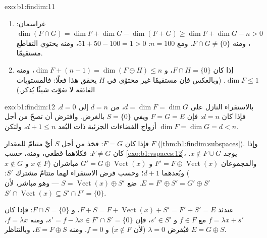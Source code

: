 \begin{solution}{exo:b1:findim:11}
\begin{enumerate}
  \item غراسمان: $\dim(F \cap G) = \dim F + \dim G - \dim(F +
        G) \geq \dim F + \dim G - n > 0$، ومنه $F \cap G \neq
        \{0\}$. ومع $n = 100$: $51 + 50 - 100 = 1 > 0$، ومنه
        يحتوي التقاطع مستقيمًا.
  \item إذا كان $F \cap H = \{0\}$،  و $\dim F +
        (n - 1) = \dim(F \oplus H) \leq n$، ومنه $\dim F \leq 1$.
        (وبالعكس فإن مستقيمًا غير محتوًى في $H$ يحقق
        هذا فعلًا: فالمستويات الفائقة لا تفوّت شيئًا يُذكر.)
\end{enumerate}
\end{solution}

\begin{solution}{exo:b1:findim:12}
بالاستقراء النازل على $d = \dim F = \dim G$، من $d = n$ إلى $d =
0$. فإذا كان $d = n$: فإن $F = G = E$ ويفي $S = \{0\}$ بالغرض. وافترض أن
 تصحّ من أجل أزواج الفضاءات الجزئية ذات البُعد $d + 1 \leq n$،
ولتكن $\dim F = \dim G = d < n$.

فإذا كان $F = G$: فخذ من أجل $S$ أيَّ متتامّ للمقدار $F$
(\cref{thm:b1:findim:subspaces}). وإذا كان $F \neq G$: فكلاهما قطعي،
ومنه، حسب \cref{exo:b1:vspaces:12}، يوجد $x \notin F \cup G$.
والمجموعان $F' = F \oplus \operatorname{Vect}(x)$ و $G' = G \oplus
\operatorname{Vect}(x)$ مباشران ($x \notin F$ و $x \notin G$)
وبُعدهما $d + 1$؛ وحسب فرض الاستقراء لهما
متتامّ مشترك $S'$: $E = F' \oplus S' = G' \oplus
S'$. ضع $S = \operatorname{Vect}(x) \oplus S'$ --- وهو مباشر،
لأن $S' \cap \operatorname{Vect}(x) \subseteq S' \cap F' =
\{0\}$.

عندئذ $F + S = F + \operatorname{Vect}(x) + S' = F' + S' = E$، و
$F \cap S = \{0\}$: فإذا كان $f = \lambda x + s'$ مع $f \in F$ و $s'
\in S'$، فإن $s' = f - \lambda x \in F' \cap S' = \{0\}$، ومنه $f
= \lambda x$، فيُفرض $\lambda = 0$ (لأن $x \notin F$) و $f = 0$.
ومنه $E = F \oplus S$، وبالتناظر $E = G \oplus S$.
\end{solution}

